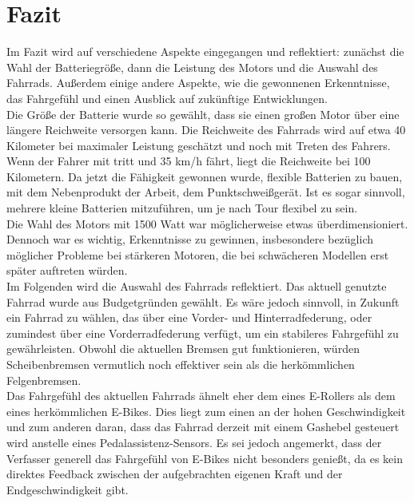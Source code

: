  \chapter{Fazit}


Im Fazit wird auf verschiedene Aspekte eingegangen und reflektiert: zunächst die Wahl der Batteriegröße, dann die Leistung des Motors und die Auswahl des Fahrrads.
Außerdem einige andere Aspekte, wie die gewonnenen Erkenntnisse, das Fahrgefühl und einen Ausblick auf zukünftige Entwicklungen.\\


Die Größe der Batterie wurde so gewählt, dass sie einen großen Motor über eine längere Reichweite versorgen kann.
Die Reichweite des Fahrrads wird auf etwa 40 Kilometer bei maximaler Leistung geschätzt und noch mit Treten des Fahrers.
Wenn der Fahrer mit tritt und 35 km/h fährt, liegt die Reichweite bei 100 Kilometern.
Da jetzt die Fähigkeit gewonnen wurde, flexible Batterien zu bauen, mit dem Nebenprodukt der Arbeit, dem Punktschweißgerät.
Ist es sogar sinnvoll, mehrere kleine Batterien mitzuführen, um je nach Tour flexibel zu sein.\\



Die Wahl des Motors mit 1500 Watt war möglicherweise etwas überdimensioniert.
Dennoch war es wichtig, Erkenntnisse zu gewinnen, insbesondere bezüglich möglicher Probleme bei stärkeren Motoren, die bei schwächeren Modellen erst später auftreten würden.\\


Im Folgenden wird die Auswahl des Fahrrads reflektiert.
Das aktuell genutzte Fahrrad wurde aus Budgetgründen gewählt.
Es wäre jedoch sinnvoll, in Zukunft ein Fahrrad zu wählen, das über eine Vorder- und Hinterradfederung, oder zumindest über eine Vorderradfederung verfügt, um ein stabileres Fahrgefühl zu gewährleisten.
Obwohl die aktuellen Bremsen gut funktionieren, würden Scheibenbremsen vermutlich noch effektiver sein als die herkömmlichen Felgenbremsen.\\


Das Fahrgefühl des aktuellen Fahrrads ähnelt eher dem eines E-Rollers als dem eines herkömmlichen E-Bikes.
Dies liegt zum einen an der hohen Geschwindigkeit und zum anderen daran, dass das Fahrrad derzeit mit einem Gashebel gesteuert wird anstelle eines Pedalassistenz-Sensors.
Es sei jedoch angemerkt, dass der Verfasser generell das Fahrgefühl von E-Bikes nicht besonders genießt, da es kein direktes Feedback zwischen der aufgebrachten eigenen Kraft und der Endgeschwindigkeit gibt.\\

